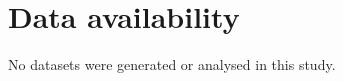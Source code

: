 \documentclass[reqno]{amsart}
\theoremstyle{plain}
\numberwithin{equation}{section}
\numberwithin{definition}{section}
\begin{document}
\section*{Data availability}

No datasets were generated or analysed in this study.
\end{document}

